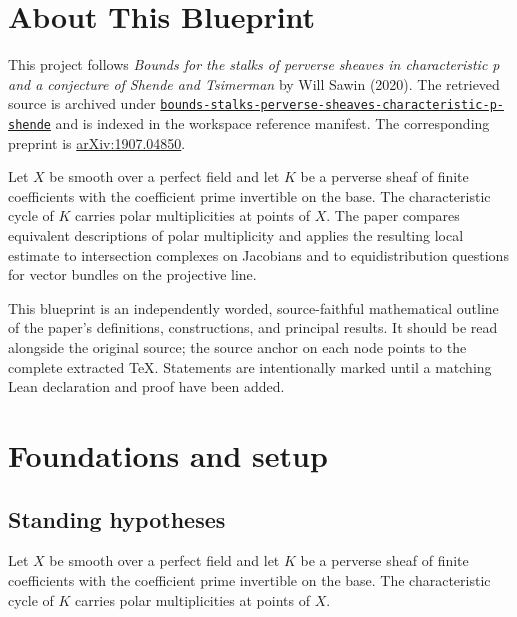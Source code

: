 

\chapter*{About This Blueprint}
\label{bounds-stalks-perverse-sheaves-characteristic-p-shende-about}

This project follows \emph{Bounds for the stalks of perverse sheaves in characteristic p and a conjecture of Shende and Tsimerman} by Will Sawin (2020). The
retrieved source is archived under
\href{../../../../../references/bounds-stalks-perverse-sheaves-characteristic-p-shende/}{\texttt{bounds-stalks-perverse-sheaves-characteristic-p-shende}} and is indexed in
the workspace reference manifest. The corresponding preprint is
\href{https://arxiv.org/abs/1907.04850}{arXiv:1907.04850}.

Let $X$ be smooth over a perfect field and let $K$ be a perverse sheaf of finite coefficients with the coefficient prime invertible on the base. The characteristic cycle of $K$ carries polar multiplicities at points of $X$. The paper compares equivalent descriptions of polar multiplicity and applies the resulting local estimate to intersection complexes on Jacobians and to equidistribution questions for vector bundles on the projective line.

This blueprint is an independently worded, source-faithful mathematical
outline of the paper's definitions, constructions, and principal results. It
should be read alongside the original source; the source anchor on each node
points to the complete extracted TeX. Statements are intentionally marked
\notready until a matching Lean declaration and proof have been added.

\chapter{Foundations and setup}
\label{chap:bounds-stalks-perverse-sheaves-characteristic-p-shende-foundations}

\section{Standing hypotheses}
\label{sec:bounds-stalks-perverse-sheaves-characteristic-p-shende-standing}

Let $X$ be smooth over a perfect field and let $K$ be a perverse sheaf of finite coefficients with the coefficient prime invertible on the base. The characteristic cycle of $K$ carries polar multiplicities at points of $X$.

